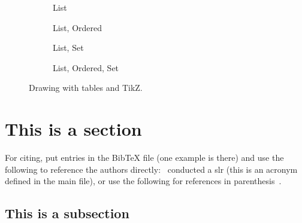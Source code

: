 \begin{figure}
    \begin{subfigure}{0.29\textwidth}
        {\ohfill}{\oh}{\oh}
        {\ohfill}{\oh}
        {\oh}
        \caption{{{List}}}\label{ex:tictactoe1}
    \end{subfigure}
    \begin{subfigure}{0.21\textwidth}
        \tictactoe{}{}{}
        {\ohfill}{\ohfill}{\oh}
        {\oh}    {\ohfill}
        {\ohfill}
        \caption{{{List}, {Ordered}}}\label{ex:tictactoe2}
    \end{subfigure}
    \begin{subfigure}{0.19\textwidth}
        \tictactoe{}{}{}
        {\ohfill}{\oh}{\ohfill}
        {\ohfill}{\oh}
        {\oh}
        \caption{{{List}, {Set}}}\label{ex:tictactoe3}
    \end{subfigure}
    \begin{subfigure}{0.26\textwidth}
        \tictactoe{}{}{}
        {\ohfill}{\ohfill}{\ohfill}
        {\oh}    {\ohfill}
        {\ohfill}
        \caption{{{List}, {Ordered}, {Set}}}\label{ex:tictactoe4}
    \end{subfigure}
    \caption[Drawing with tables and TikZ]{Drawing with tables and TikZ.}\label{ex:tictactoe}
\end{figure}

\section{This is a section}

For citing, put entries in the BibTeX file (one example is there) and use the following to reference the authors directly:~\cite{Heradio2016Bibliometric} conducted a \gls{slr} (this is an acronym defined in the main file), or use the following for references in parenthesis~\citep{Heradio2016Bibliometric}.
~\cite{pix3d} ~\cite{Lim2013ParsingIO}
\subsection{This is a subsection}


